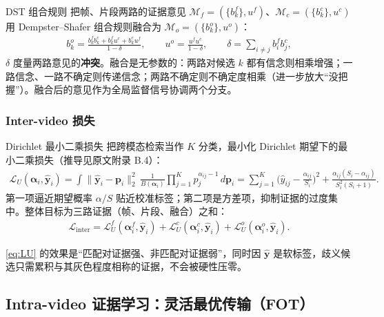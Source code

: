 \documentclass[11pt,a4paper,UTF8,fontset=windows]{ctexart}
\newcommand{\term}[1]{\textbf{#1}}
\newcommand{\vect}[1]{\boldsymbol{#1}}
\begin{document}
\begin{structbox}{DST 组合规则}
把帧、片段两路的证据意见 $\mathcal{M}_f=(\{b^f_k\},u^f)$、$\mathcal{M}_c=(\{b^c_k\},u^c)$ 用 Dempster--Shafer 组合规则融合为 $\mathcal{M}_o=(\{b^o_k\},u^o)$：
\begin{align}
b^o_k = \frac{b^f_k b^c_k + b^f_k u^c + b^c_k u^f}{1-\delta},\qquad
u^o = \frac{u^f u^c}{1-\delta},\qquad
\delta = \sum_{i\neq j} b^f_i b^c_j,
\end{align}
$\delta$ 度量两路意见的\term{冲突}。融合是无参数的：两路对候选 $k$ 都有信念则相乘增强；一路信念、一路不确定则传递信念；两路不确定则不确定度相乘（进一步放大“没把握”）。融合后的意见作为全局监督信号协调两个分支。
\end{structbox}

\subsubsection{Inter-video 损失}

\begin{structbox}{Dirichlet 最小二乘损失}
把跨模态检索当作 $K$ 分类，最小化 Dirichlet 期望下的最小二乘损失（推导见原文附录 B.4）：
\begin{align}
\mathcal{L}_U(\vect\alpha_i,\hat{\vect y}_i)
= \int \|\hat{\vect y}_i - \vect p_i\|_2^2\, \frac{1}{B(\vect\alpha_i)}\prod_{j=1}^{K} p_j^{\alpha_{ij}-1}\,d\vect p_i
= \sum_{j=1}^{K} \Big(\hat y_{ij} - \frac{\alpha_{ij}}{S_i}\Big)^{2} + \frac{\alpha_{ij}(S_i-\alpha_{ij})}{S_i^2 (S_i+1)}.
\label{eq:LU}
\end{align}
第一项逼近期望概率 $\alpha/S$ 贴近校准标签；第二项是方差项，抑制证据的过度集中。整体目标为三路证据（帧、片段、融合）之和：
\begin{align}
\mathcal{L}_{\mathrm{inter}} = \mathcal{L}^f_U(\vect\alpha^f_i,\hat{\vect y}_i) + \mathcal{L}^c_U(\vect\alpha^c_i,\hat{\vect y}_i) + \mathcal{L}^o_U(\vect\alpha^o_i,\hat{\vect y}_i).
\end{align}
\end{structbox}

\eqref{eq:LU} 的效果是“匹配对证据强、非匹配对证据弱”，同时因 $\hat{\vect y}$ 是软标签，歧义候选只需累积与其灰色程度相称的证据，不会被硬性压零。

\subsection{Intra-video 证据学习：灵活最优传输（FOT）}
\end{document}
